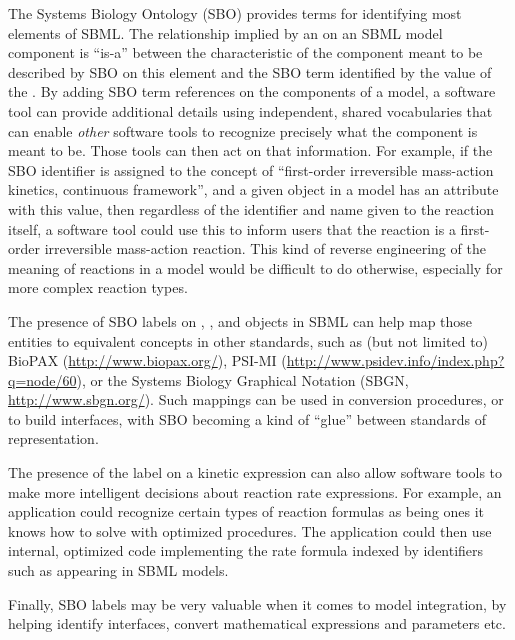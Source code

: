 The Systems Biology Ontology (SBO) provides terms for identifying
most elements of SBML. The relationship implied by an
 on an SBML model component is ``is-a'' between the
characteristic of the component meant to be described by SBO on
this element and the SBO term identified by the value of the
. By adding SBO term references on the components
of a model, a software tool can provide additional details using
independent, shared vocabularies that can enable \emph{other}
software tools to recognize precisely what the component is meant
to be.  Those tools can then act on that information.  For
example, if the SBO identifier  is assigned to
the concept of ``first-order irreversible mass-action kinetics,
continuous framework'', and a given \KineticLaw object in a model
has an  attribute with this value, then regardless
of the identifier and name given to the reaction itself, a
software tool could use this to inform users that the reaction is
a first-order irreversible mass-action reaction.  This kind of
reverse engineering of the meaning of reactions in a model would
be difficult to do otherwise, especially for more complex reaction
types.

The presence of SBO labels on \Compartment, \Species, and
\Reaction objects in SBML can help map those entities to
equivalent concepts in other standards, such as (but not limited
to) BioPAX (\url{http://www.biopax.org/}), PSI-MI
(\url{http://www.psidev.info/index.php?q=node/60}), or the Systems
Biology Graphical Notation (SBGN, \url{http://www.sbgn.org/}).
Such mappings can be used in conversion procedures, or to build
interfaces, with SBO becoming a kind of ``glue'' between standards
of representation.

The presence of the label on a kinetic expression can also allow
software tools to make more intelligent decisions about reaction
rate expressions.  For example, an application could recognize
certain types of reaction formulas as being ones it
knows how to solve with optimized procedures.  The application
could then use internal, optimized code implementing the rate
formula indexed by identifiers such as 
appearing in SBML models.

Finally, SBO labels may be very valuable when it comes to model
integration, by helping identify interfaces, convert mathematical
expressions and parameters etc.


